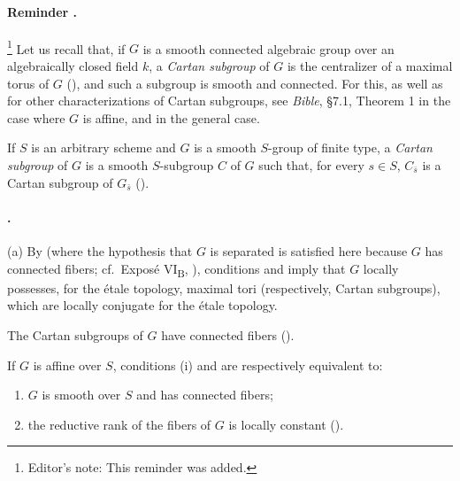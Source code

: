 \paragraph{Reminder .}
\footnote{Editor's note: This reminder was added.}
Let us recall that, if \(G\) is a smooth connected algebraic group
over an algebraically closed field \(k\), a \emph{Cartan subgroup}
of \(G\) is the centralizer of a maximal torus of \(G\)
\textup{()}, and such a subgroup is smooth and
connected. For this, as well as for other characterizations of
Cartan subgroups, see \emph{Bible}, \S7.1, Theorem 1 in the case
where \(G\) is affine, and  in the general
case.

If \(S\) is an arbitrary scheme and \(G\) is a smooth \(S\)-group
of finite type, a \emph{Cartan subgroup} of \(G\) is a smooth
\(S\)-subgroup \(C\) of \(G\) such that, for every \(s\in S\),
\(C_{\bar s}\) is a Cartan subgroup of \(G_{\bar s}\)
\textup{()}.

\paragraph{.}
\textup{(a)} By  \textup{(where the hypothesis that
\(G\) is separated is satisfied here because \(G\) has connected
fibers; cf.\ Exposé VI\textsubscript{B}, )}, conditions
\textup{} and \textup{} imply that \(G\) locally possesses,
for the étale topology, maximal tori \textup{(respectively, Cartan
subgroups)}, which are locally conjugate for the étale topology.

\textup{} The Cartan subgroups of \(G\) have connected fibers
\textup{()}.

\textup{} If \(G\) is affine over \(S\), conditions
\textup{(i)} and \textup{} are respectively equivalent to:
\begin{enumerate}
\item[\textup{(i$'$)}]
\(G\) is smooth over \(S\) and has connected fibers;

\item[\textup{(ii$'$)}]
the reductive rank of the fibers of \(G\) is locally constant
\textup{()}.
\end{enumerate}

